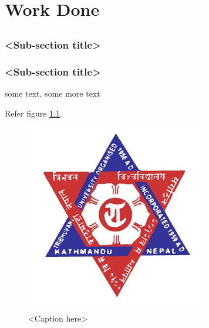 \chapter{Work Done}

\section{}

\subsection{<Sub-section title>}

\subsection{<Sub-section title>}
some text\cite{citation-2-name-here}, some more text

Refer figure \ref{fig:label}.

\begin{figure}[htb]
\centering
\includegraphics[scale=0.3]{tu} %
\caption{<Caption here>}
\label{fig:label} %
\end{figure}
